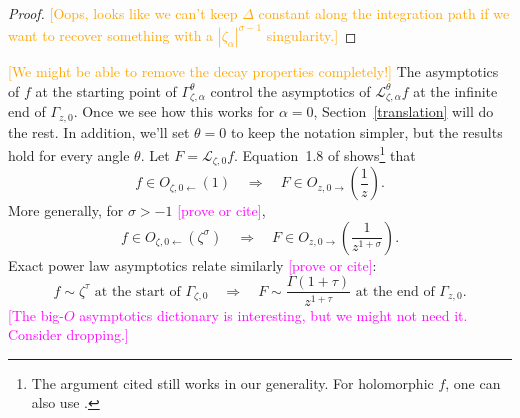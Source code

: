 \documentclass{article}
\let\Re\relax
\DeclareMathOperator{\Re}{Re}
\newcommand{\R}{\mathbb{R}}
\newcommand{\laplace}{\mathcal{L}}
\theoremstyle{definition}
\theoremstyle{plain}
\begin{document}
\begin{proof}
\textcolor{orange}{[Oops, looks like we can't keep $\Delta$ constant along the integration path if we want to recover something with a $|\zeta_\alpha|^{\sigma-1}$ singularity.]}
\end{proof}
\color{RoyalBlue}
\textcolor{orange}{[We might be able to remove the decay properties completely!]} The asymptotics of $f$ at the starting point of $\Gamma_{\zeta, \alpha}^\theta$ control the asymptotics of $\laplace_{\zeta, \alpha}^\theta f$ at the infinite end of $\Gamma_{z, 0}$. Once we see how this works for $\alpha = 0$, Section~\ref{translation} will do the rest. In addition, we'll set $\theta=0$ to keep the notation simpler, but the results hold for every angle $\theta$. Let $F = \laplace_{\zeta, 0} f$. Equation~1.8 of \cite{laplace-tfm} shows\footnote{The argument cited still works in our generality. For holomorphic $f$, one can also use \cite[Equation 1.5]{sternin1995borel}.} that
\[ f \in O_{\zeta, 0 \leftarrow}(1) \quad\Longrightarrow\quad F \in O_{z, 0 \rightarrow}\left(\frac{1}{z}\right). \]
More generally, for $\sigma > -1$ \textcolor{magenta}{[prove or cite]},
\[ f \in O_{\zeta, 0 \leftarrow}(\zeta^\sigma) \quad\Longrightarrow\quad F \in O_{z, 0 \rightarrow}\left(\frac{1}{z^{1 + \sigma}}\right). \]
Exact power law asymptotics relate similarly \textcolor{magenta}{[prove or cite]}:
\[ f \sim \zeta^\tau \text{ at the start of } \Gamma_{\zeta, 0} \quad\Longrightarrow\quad F \sim \frac{\Gamma(1+\tau)}{z^{1+\tau}} \text{ at the end of } \Gamma_{z, 0}. \]
\textcolor{magenta}{[The big-$O$ asymptotics dictionary is interesting, but we might not need it. Consider dropping.]}
\color{black}
%
%
%
\end{document}
